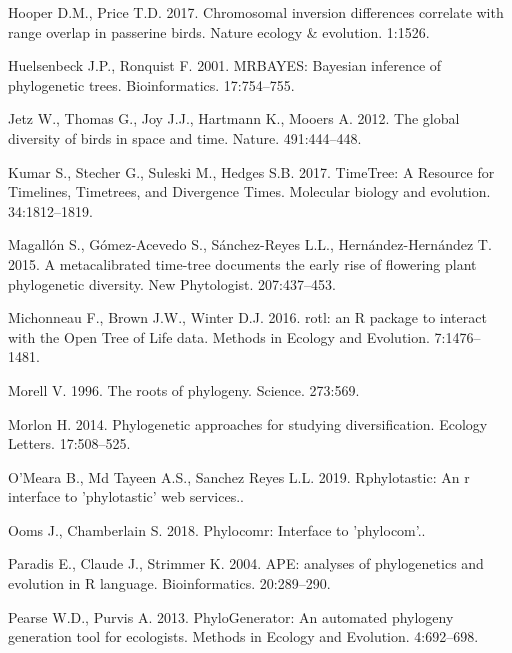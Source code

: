 \documentclass[]{article}
\begin{document}
\leavevmode\hypertarget{ref-hooper2017chromosomal}{}%
Hooper D.M., Price T.D. 2017. Chromosomal inversion differences correlate with range overlap in passerine birds. Nature ecology \& evolution. 1:1526.

\leavevmode\hypertarget{ref-Huelsenbeck2001}{}%
Huelsenbeck J.P., Ronquist F. 2001. MRBAYES: Bayesian inference of phylogenetic trees. Bioinformatics. 17:754--755.

\leavevmode\hypertarget{ref-Jetz2012}{}%
Jetz W., Thomas G., Joy J.J., Hartmann K., Mooers A. 2012. The global diversity of birds in space and time. Nature. 491:444--448.

\leavevmode\hypertarget{ref-Kumar2017}{}%
Kumar S., Stecher G., Suleski M., Hedges S.B. 2017. TimeTree: A Resource for Timelines, Timetrees, and Divergence Times. Molecular biology and evolution. 34:1812--1819.

\leavevmode\hypertarget{ref-magallon2015metacalibrated}{}%
Magallón S., Gómez-Acevedo S., Sánchez-Reyes L.L., Hernández-Hernández T. 2015. A metacalibrated time-tree documents the early rise of flowering plant phylogenetic diversity. New Phytologist. 207:437--453.

\leavevmode\hypertarget{ref-Michonneau2016}{}%
Michonneau F., Brown J.W., Winter D.J. 2016. rotl: an R package to interact with the Open Tree of Life data. Methods in Ecology and Evolution. 7:1476--1481.

\leavevmode\hypertarget{ref-morell1996roots}{}%
Morell V. 1996. The roots of phylogeny. Science. 273:569.

\leavevmode\hypertarget{ref-Morlon2014}{}%
Morlon H. 2014. Phylogenetic approaches for studying diversification. Ecology Letters. 17:508--525.

\leavevmode\hypertarget{ref-Omeara2019}{}%
O'Meara B., Md Tayeen A.S., Sanchez Reyes L.L. 2019. Rphylotastic: An r interface to 'phylotastic' web services..

\leavevmode\hypertarget{ref-Ooms2018}{}%
Ooms J., Chamberlain S. 2018. Phylocomr: Interface to 'phylocom'..

\leavevmode\hypertarget{ref-Paradis2004}{}%
Paradis E., Claude J., Strimmer K. 2004. APE: analyses of phylogenetics and evolution in R language. Bioinformatics. 20:289--290.

\leavevmode\hypertarget{ref-pearse2013phylogenerator}{}%
Pearse W.D., Purvis A. 2013. PhyloGenerator: An automated phylogeny generation tool for ecologists. Methods in Ecology and Evolution. 4:692--698.
\end{document}
